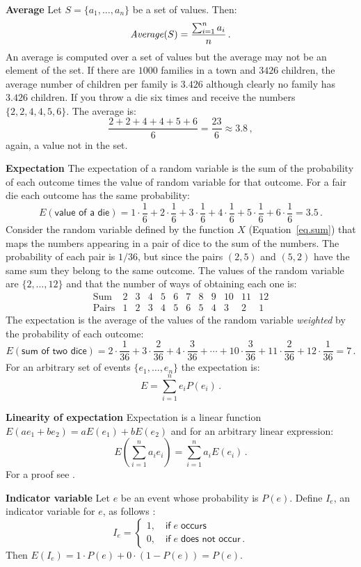 \textbf{Average}
Let $S=\{a_1,\ldots,a_n\}$ be a set of values. Then:
\[
\mathit{Average}(S)=\displaystyle\frac{\sum_{i=1}^{n} a_i}{n}\,.
\]
An average is computed over a set of values but the average may not be an element of the set. If there are $1000$ families in a town and $3426$ children, the average number of children per family is $3.426$ although clearly no family has $3.426$ children. If you throw a die six times and receive the numbers $\{2,2,4,4,5,6\}$. The average is:
\[
\frac{2+2+4+4+5+6}{6}=\frac{23}{6}\approx 3.8\,,
\]
again, a value not in the set.

\textbf{Expectation}
The expectation of a random variable is the sum of the probability of each outcome times the value of random variable for that outcome. For a fair die each outcome has the same probability:
\[
E(\textsf{value of a die})=1\cdot \frac{1}{6} + 2\cdot\frac{1}{6} + 3\cdot\frac{1}{6} + 4\cdot\frac{1}{6} + 5\cdot\frac{1}{6} + 6\cdot\frac{1}{6}=3.5\,.
\]
Consider the random variable defined by the function $X$ (Equation~\ref{eq.sum}) that maps the numbers appearing in a pair of dice to the sum of the numbers. The probability of each pair is $1/36$, but since the pairs $(2,5)$ and $(5,2)$ have the same sum they belong to the same outcome. The values of the random variable are $\{2,\ldots,12\}$ and that the number of ways of obtaining each one is:
\[
\begin{array}{l|rrrrrrrrrrr}
\textrm{Sum} & 2 & 3 & 4 & 5 & 6 & 7 & 8 & 9 & 10 & 11 & 12\\\hline
\textrm{Pairs} & 1 & 2 & 3 & 4 & 5 & 6 & 5 & 4 & 3 & 2 & 1
\end{array}
\]
The expectation is the average of the values of the random variable \emph{weighted} by the probability of each outcome:
\[
E(\textsf{sum of two dice})=2\cdot \frac{1}{36} + 3\cdot \frac{2}{36} + 4\cdot \frac{3}{36} + 
\cdots + 10\cdot \frac{3}{36} + 11\cdot \frac{2}{36} + 12\cdot \frac{1}{36} = 7\,.
\]
For an arbitrary set of events $\{e_1,\ldots,e_n\}$ the expectation is:
\[
E=\sum_{i=1}^{n} e_iP(e_i)\,.
\]

\textbf{Linearity of expectation}\label{p.linearity}
Expectation is a linear function $E(ae_1 + be_2) = aE(e_1) + bE(e_2)$ and for an arbitrary linear expression:
\[
E\left(\sum_{i=1}^{n} a_ie_i\right)=\sum_{i=1}^{n} a_iE(e_i)\,.
\]
For a proof see \cite[Section~4.9]{ross}.

\textbf{Indicator variable} Let $e$ be an event whose probability is $P(e)$. Define $I_e$, an indicator variable for $e$, as follows \cite[Chapter~4, Example~3b]{ross}:
\[
I_e=
\left\{
\begin{array}{ll}
1,\quad \textsf{if}\; e\;\textsf{occurs}\\
0, \quad \textsf{if}\;e\;\textsf{does not occur}\,.
\end{array}
\right.
\]
Then $E(I_e)=1\cdot P(e) + 0\cdot (1-P(e))=P(e)$.

